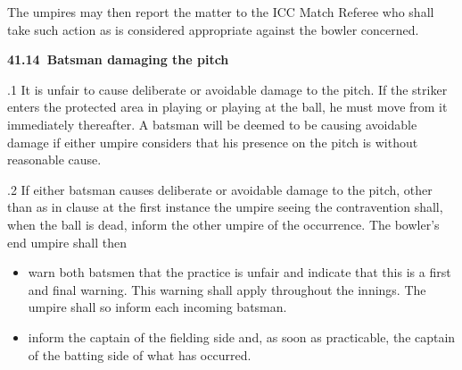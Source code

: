 \documentclass[12pt]{article}
\begin{document}
\vspace{\baselineskip}
\begin{adjustwidth}{0.5in}{0.57in}
{\fontsize{9pt}{10.8pt}\selectfont The umpires may then report the matter to the ICC Match Referee who shall take such action as is considered appropriate against the bowler concerned.\par}\par

\end{adjustwidth}


\vspace{\baselineskip}
{\fontsize{11pt}{13.2pt}\selectfont \textbf{41.14\  Batsman damaging the pitch}\par}\par


\vspace{\baselineskip}
\begin{adjustwidth}{0.5in}{0.1in}
{\fontsize{9pt}{10.8pt}.1 It is unfair to cause deliberate or avoidable damage to the pitch. If the striker enters the protected area in playing or playing at the ball, he must move from it immediately thereafter. A batsman will be deemed to be causing avoidable damage if either umpire considers that his presence on the pitch is without reasonable cause.\par}\par

\end{adjustwidth}


\vspace{\baselineskip}
\begin{adjustwidth}{0.5in}{0.03in}
{\fontsize{9pt}{10.8pt}.2 If either batsman causes deliberate or avoidable damage to the pitch, other than as in clause at the first instance the umpire seeing the contravention shall, when the ball is dead, inform the other umpire of the occurrence. The bowler’s end umpire shall then\par}\par

\end{adjustwidth}


\vspace{\baselineskip}
\begin{itemize}
	\item {\fontsize{9pt}{10.8pt}\selectfont warn both batsmen that the practice is unfair and indicate that this is a first and final warning. This warning shall apply throughout the innings. The umpire shall so inform each incoming batsman.\par}\par


\vspace{\baselineskip}
	\item {\fontsize{9pt}{10.8pt}\selectfont inform the captain of the fielding side and, as soon as practicable, the captain of the batting side of what has occurred.\par}
\end{itemize}\par
\end{document}
